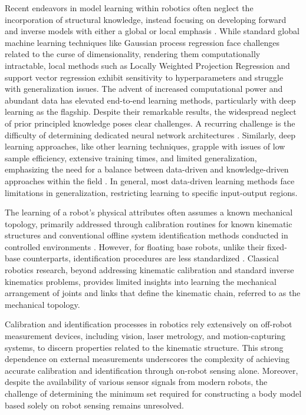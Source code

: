 \documentclass[12pt, a4paper]{article}
\begin{document}
Recent endeavors in model learning within robotics often neglect the incorporation of structural knowledge, instead focusing on developing forward and inverse models with either a global or local emphasis \cite{NguyenTuong2011Modellearningrobot}. While standard global machine learning techniques like Gaussian process regression face challenges related to the curse of dimensionality, rendering them computationally intractable, local methods such as Locally Weighted Projection Regression and support vector regression exhibit sensitivity to hyperparameters and struggle with generalization issues. The advent of increased computational power and abundant data has elevated end-to-end learning methods, particularly with deep learning as the flagship. Despite their remarkable results, the widespread neglect of prior principled knowledge poses clear challenges. A recurring challenge is the difficulty of determining dedicated neural network architectures \cite{Baker2017Designingneuralnetwork,Elsken2019Neuralarchitecturesearch}. Similarly, deep learning approaches, like other learning techniques, grapple with issues of low sample efficiency, extensive training times, and limited generalization, emphasizing the need for a balance between data-driven and knowledge-driven approaches within the field \cite{Pierson2017Deeplearningrobotics,Suenderhauf2018limitspotentialsdeep}. In general, most data-driven learning methods face limitations in generalization, restricting learning to specific input-output regions.

The learning of a robot's physical attributes often assumes a known mechanical topology, primarily addressed through calibration routines for known kinematic structures \cite{Hollerbach1996CalibrationIndexTaxonomy} and conventional offline system identification methods conducted in controlled environments \cite{Swevers2007Dynamicmodelidentification,LeboutetInertialParameterIdentification}. However, for floating base robots, unlike their fixed-base counterparts, identification procedures are less standardized \cite{Ayusawa2014Identifiabilityidentificationinertial,Lee2022OptimizedSystemIdentification}. Classical robotics research, beyond addressing kinematic calibration and standard inverse kinematics problems, provides limited insights into learning the mechanical arrangement of joints and links that define the kinematic chain, referred to as the mechanical topology.

Calibration and identification processes in robotics rely extensively on off-robot measurement devices, including vision, laser metrology, and motion-capturing systems, to discern properties related to the kinematic structure. This strong dependence on external measurements underscores the complexity of achieving accurate calibration and identification through on-robot sensing alone. Moreover, despite the availability of various sensor signals from modern robots, the challenge of determining the minimum set required for constructing a body model based solely on robot sensing remains unresolved.
\end{document}
